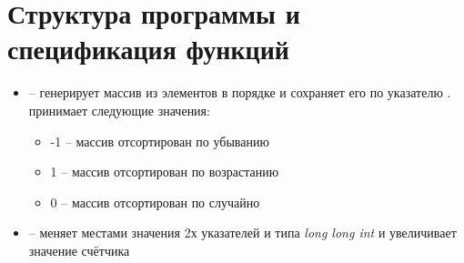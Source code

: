 \documentclass[a4paper,12pt,titlepage,finall]{article}
\begin{document}
\section{Структура программы и спецификация функций}
\begin{itemize}
\item {}\rmfamily – генерирует массив из  \rmfamily элементов в порядке
 \rmfamily и сохраняет его по указателю \rmfamily.\\
 \rmfamily принимает следующие значения:
    \begin{itemize}
    \item -1 – массив отсортирован по убыванию
    \item 1 – массив отсортирован по возрастанию
    \item 0 – массив отсортирован по случайно
    \end{itemize}

\item {}\rmfamily – меняет местами значения 2х указателей  \rmfamily и  \rmfamily типа \textit{long long int}
\rmfamily и увеличивает значение счётчика 


\end{itemize}
\end{document}
